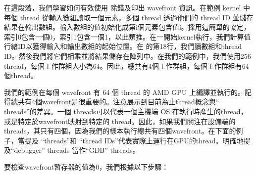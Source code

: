 在這段落，我們學習如何有效使用  除錯及印出 wavefront 資訊。在範例 kernel 中每個 thread 從輸入數組讀取一個元素，多個 thread 透過他們的 thread ID 並儲存結果在輸出數組。輸入數組的值初始化成第i個元素包含值i。採用這簡單的協定，索引0包含一個0，索引1包含一個1，以此類推。在一開始kernel執行，我們計算值行緒ID以獲得輸入和輸出數組的起始位置。在 的第18行，我們讀數組和thread ID。然後我們將它們相乘並將結果儲存在陣列中。在我們的範例中，我們使用256 thread，每個工作群組大小為64。因此，總共有4個工作群組，每個工作群組有64個thread。

我們的範例在每個 wavefront 有 64 個 thread 的 AMD GPU 上編譯並執行的。記得總共有4個wavefront是很重要的。注意展示到目前為止thread概念與“ threads”的差異。一個 threads可以代表一個主機端 OS 在執行時產生的thread，或是特定於wavefront映射到特定的 thread。因此，如果我們關注在設備端的 threads，其只有四個，因為我們的樣本執行總共有四個wavefront。在下面的例子，當提及 “threads”和 “thread IDs”代表實際上運行在GPU的thread。明確地提及“debugger” threads 當作“GDB” threads。

要檢查wavefront暫存器的值為0，我們根據以下步驟：

